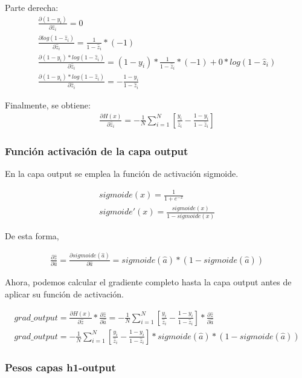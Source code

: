 Parte derecha:
\begin{gather}
	\frac{\partial (1-y_i)}{\partial \hat{z}_i} = 0\\
	\frac{\partial log(1-\hat{z}_i)}{\partial \hat{z}_i} = \frac{1}{1-\hat{z}_i} * (-1) \\
	\frac{\partial (1-y_i)*log(1-\hat{z}_i)}{\partial \hat{z}_i} = (1-y_i)*\frac{1}{1-\hat{z}_i}*(-1) + 0* log(1-\hat{z}_i) \\
	\frac{\partial (1-y_i)*log(1-\hat{z}_i)}{\partial \hat{z}_i} = -\frac{1-y_i}{1-\hat{z}_i}
\end{gather}

Finalmente, se obtiene: 
\begin{gather}
	\frac{\partial H(x)}{\partial \hat{z}_i} = - \frac{1}{N} \sum_{i=1}^{N}  [ \frac{y_i}{\hat{z}_i} - \frac{1-y_i}{1-\hat{z}_i} ]
\end{gather}

\subsubsection{Función activación de la capa output}
En la capa output se emplea la función de activación sigmoide. 

\begin{gather}
	sigmoide(x) = \frac{1}{1+e^{-x}} \\
	sigmoide'(x) = \frac{sigmoide(x)}{1-sigmoide(x)}
\end{gather}

De esta forma,

\begin{gather}
	\frac{\partial \hat{z}}{\partial \hat{a}} = \frac{\partial sigmoide(\hat{a})}{\partial \hat{a}} = sigmoide(\hat{a})*(1-sigmoide(\hat{a}))
\end{gather}

Ahora, podemos calcular el gradiente completo hasta la capa output antes de aplicar su función de activación.

\begin{gather}
	grad\_output = \frac{\partial H(x)}{\partial \hat{z}} * \frac{\partial \hat{z}}{\partial \hat{a}} =
	- \frac{1}{N} \sum_{i=1}^{N}  [ \frac{y_i}{\hat{z}_i} - \frac{1-y_i}{1-\hat{z}_i} ] * \frac{\partial \hat{z}}{\partial \hat{a}} \\
	grad\_output = - \frac{1}{N} \sum_{i=1}^{N}  [ \frac{y_i}{\hat{z}_i} - \frac{1-y_i}{1-\hat{z}_i} ] * sigmoide(\hat{a})*(1-sigmoide(\hat{a}))
\end{gather}

\subsubsection{Pesos capas h1-output}

